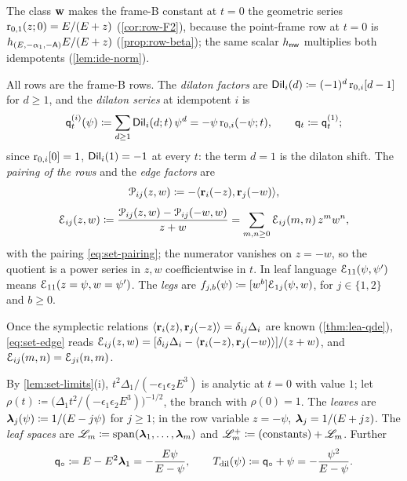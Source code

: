 The class $\mathbf{w}$ makes the frame-B constant at $t=0$ the geometric series $\mathrm{r}_{0,1}(z;0)=E/(E+z)$ (\cref{cor:row-F2}), because the point-frame row at $t=0$ is $h_{(E,-\alpha_1,-\mathsf{A})}E/(E+z)$ (\cref{prop:row-beta}); the same scalar $h_{\mathsf{nw}}$ multiplies both idempotents (\cref{lem:ide-norm}).

\begin{defn}
\label{def:set-factors}
All rows are the frame-B rows. The \emph{dilaton factors} are $\mathsf{Dil}_i(d)\coloneqq(-1)^d\,\mathrm{r}_{0,i}[d-1]$ for $d\geq1$, and the \emph{dilaton series} at idempotent $i$ is
\[
\mathsf{q}_{t}^{(i)}(\psi)\coloneqq\sum_{d\geq1}\mathsf{Dil}_i(d;t)\,\psi^d=-\psi\,\mathrm{r}_{0,i}(-\psi;t),\qquad \mathsf{q}_{t}\coloneqq\mathsf{q}_{t}^{(1)} ;
\]
since $\mathrm{r}_{0,i}[0]=1$, $\mathsf{Dil}_i(1)=-1$ at every $t$: the term $d=1$ is the dilaton shift. The \emph{pairing of the rows} and the \emph{edge factors} are
\begin{equation}
\label{eq:set-Pij}
\mathcal{P}_{ij}(z,w)\coloneqq-\langle\mathbf{r}_i(-z),\mathbf{r}_j(-w)\rangle ,
\end{equation}
\begin{equation}
\label{eq:set-edge}
\mathcal{E}_{ij}(z,w)\coloneqq\frac{\mathcal{P}_{ij}(z,w)-\mathcal{P}_{ij}(-w,w)}{z+w}=\sum_{m,n\geq0}\mathcal{E}_{ij}(m,n)\,z^mw^n ,
\end{equation}
with the pairing \eqref{eq:set-pairing}; the numerator vanishes on $z=-w$, so the quotient is a power series in $z,w$ coefficientwise in $t$. In leaf language $\mathcal{E}_{11}(\psi,\psi')$ means $\mathcal{E}_{11}(z=\psi,w=\psi')$. The \emph{legs} are $f_{j,b}(\psi)\coloneqq[w^b]\mathcal{E}_{1j}(\psi,w)$, for $j\in\{1,2\}$ and $b\geq0$.
\end{defn}

Once the symplectic relations $\langle\mathbf{r}_i(z),\mathbf{r}_j(-z)\rangle=\delta_{ij}\Delta_i$ are known (\cref{thm:lea-qde}), \eqref{eq:set-edge} reads $\mathcal{E}_{ij}(z,w)=[\delta_{ij}\Delta_i-\langle\mathbf{r}_i(-z),\mathbf{r}_j(-w)\rangle]/(z+w)$, and $\mathcal{E}_{ij}(m,n)=\mathcal{E}_{ji}(n,m)$.

\begin{defn}
\label{def:set-rho}
By \cref{lem:set-limits}(i), $t^2\Delta_1/(-\epsilon_1\epsilon_2E^3)$ is analytic at $t=0$ with value $1$; let $\rho(t)\coloneqq\big(\Delta_1t^2/(-\epsilon_1\epsilon_2E^3)\big)^{-1/2}$, the branch with $\rho(0)=1$. The \emph{leaves} are $\boldsymbol{\lambda}_j(\psi)\coloneqq1/(E-j\psi)$ for $j\geq1$; in the row variable $z=-\psi$, $\boldsymbol{\lambda}_j=1/(E+jz)$. The \emph{leaf spaces} are $\mathscr{L}_m\coloneqq\mathrm{span}(\boldsymbol{\lambda}_1,\ldots,\boldsymbol{\lambda}_m)$ and $\mathscr{L}_m^+\coloneqq(\text{constants})+\mathscr{L}_m$. Further
\[
\mathsf{q}_{\circ}\coloneqq E-E^2\boldsymbol{\lambda}_1=-\frac{E\psi}{E-\psi},\qquad T_{\mathrm{dil}}(\psi)\coloneqq\mathsf{q}_{\circ}+\psi=-\frac{\psi^2}{E-\psi}.
\]
\end{defn}

